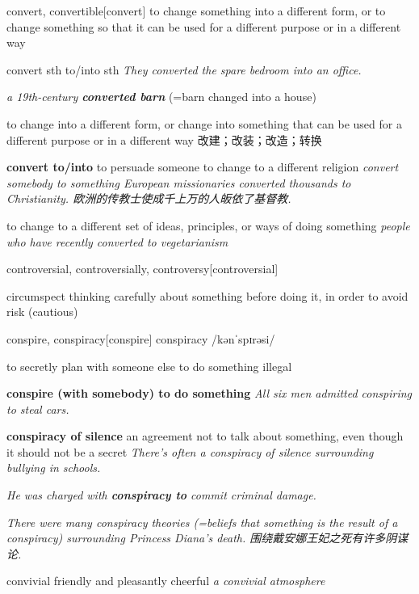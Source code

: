 \begin{DefWord}{convert, convertible}[convert]
    to change something into a different form, or to change something so that it can be used for a different purpose or in a different way

    convert sth to/into sth
    \textit{They converted the spare bedroom into an office.}

    \textit{a 19th-century \textbf{converted barn}} (=barn changed into a house)

    to change into a different form, or change into something that can be used for a different purpose or in a different way 改建；改装；改造；转换

    \textbf{convert to/into}
    to persuade someone to change to a different religion
    \textit{convert somebody to something
    European missionaries converted thousands to Christianity. 欧洲的传教士使成千上万的人皈依了基督教. }

    to change to a different set of ideas, principles, or ways of doing something
    \textit{people who have recently converted to vegetarianism}
\end{DefWord}

\begin{DefWord}{controversial, controversially, controversy}[controversial]
\end{DefWord}

\begin{DefWord}{circumspect}
    thinking carefully about something before doing it, in order to avoid risk (cautious)
\end{DefWord}

\begin{DefWord}{conspire, conspiracy}[conspire]
    conspiracy /kənˈspɪrəsi/

    to secretly plan with someone else to do something illegal

    \textbf{conspire (with somebody) to do something}
    \textit{All six men admitted conspiring to steal cars.}

    \textbf{conspiracy of silence} an agreement not to talk about something, even though it should not be a secret
    \textit{There's often a conspiracy of silence surrounding bullying in schools.}

    \textit{He was charged with \textbf{conspiracy to} commit criminal damage.}

    \textit{There were many conspiracy theories (=beliefs that something is the result of a conspiracy) surrounding Princess Diana's death. 围绕戴安娜王妃之死有许多阴谋论. }
\end{DefWord}

\begin{DefWord}{convivial}
    friendly and pleasantly cheerful
    \textit{a convivial atmosphere}
\end{DefWord}